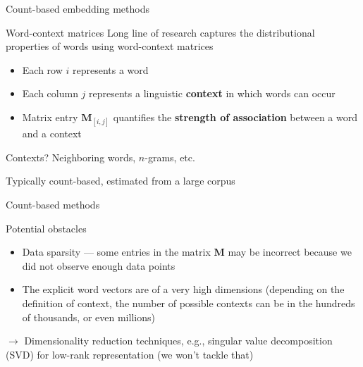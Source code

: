 \documentclass[12pt,aspectratio=169,handout]{beamer}
\begin{document}
\begin{frame}{Count-based embedding methods}

\begin{block}{Word-context matrices}
Long line of research captures the distributional properties of words using word-context matrices
\begin{itemize}
	\item Each row $i$ represents a word
	\item Each column $j$ represents a linguistic \textbf{context} in which words can occur
	\item Matrix entry $\bm{M}_{[i, j]}$ quantifies the \textbf{strength of association} between
	a word and a context
\end{itemize}
\end{block}
Contexts? Neighboring words, $n$-grams, etc.

Typically count-based, estimated from a large corpus

\end{frame}

\begin{frame}{Count-based methods}

Potential obstacles

\begin{itemize}
	\item Data sparsity --- some entries in the matrix $\bm{M}$ may be incorrect because we did not observe enough data points
	\item The explicit word vectors are of a very high dimensions (depending on the definition of context, the number of possible contexts can be in the hundreds of thousands, or even millions)
\end{itemize}

$\to$ Dimensionality reduction techniques, e.g., singular value decomposition (SVD) for low-rank representation (we won't tackle that)
\end{frame}
\end{document}
